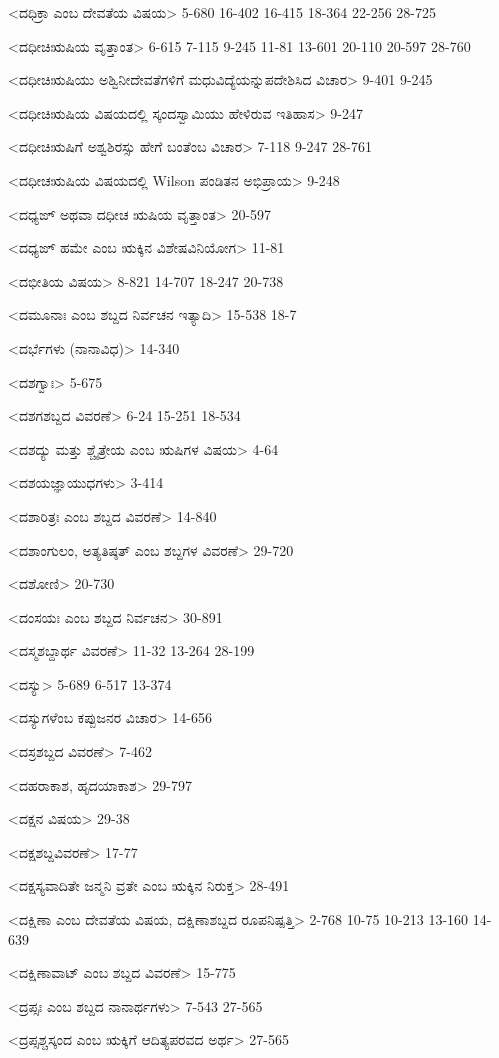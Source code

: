 <ದಧಿಕ್ರಾ ಎಂಬ ದೇವತೆಯ ವಿಷಯ>
5-680 
16-402 
16-415 
18-364
22-256
28-725

<ದಧೀಚಿಋಷಿಯ ವೃತ್ತಾಂತ>
6-615 
7-115 
9-245 
11-81 
13-601
20-110
20-597
28-760

<ದಧೀಚಿಋಷಿಯು ಅಶ್ವಿನೀದೇವತೆಗಳಿಗೆ ಮಧುವಿದ್ಯೆಯನ್ನುಪದೇಶಿಸಿದ ವಿಚಾರ>
9-401 
9-245

<ದಧೀಚಿಋಷಿಯ ವಿಷಯದಲ್ಲಿ ಸ್ಕಂದಸ್ವಾಮಿಯು ಹೇಳಿರುವ ಇತಿಹಾಸ>
9-247

<ದಧೀಚಿಋಷಿಗೆ ಅಶ್ವಶಿರಸ್ಸು ಹೇಗೆ ಬಂತೆಂಬ ವಿಚಾರ>
7-118 
9-247
28-761

<ದಧೀಚಋಷಿಯ ವಿಷಯದಲ್ಲಿ Wilson ಪಂಡಿತನ ಅಭಿಪ್ರಾಯ>
9-248

<ದಧ್ಯಙ್‍ ಅಥವಾ ದಧೀಚ ಋಷಿಯ ವೃತ್ತಾಂತ>
20-597

<ದಧ್ಯಙ್‍ ಹಮೇ ಎಂಬ ಋಕ್ಕಿನ ವಿಶೇಷವಿನಿಯೋಗ>
11-81

<ದಭೀತಿಯ ವಿಷಯ>
8-821 
14-707 
18-247 
20-738

<ದಮೂನಾಃ ಎಂಬ ಶಬ್ದದ ನಿರ್ವಚನ ಇತ್ಯಾದಿ>
15-538 
18-7

<ದರ್ಭೆಗಳು (ನಾನಾವಿಧ)>
14-340

<ದಶಗ್ವಾಃ>
5-675

<ದಶಗಶಬ್ದದ ವಿವರಣೆ>
6-24 
15-251 
18-534

<ದಶದ್ಯು ಮತ್ತು ಶ್ಚೈತ್ರೇಯ ಎಂಬ ಋಷಿಗಳ ವಿಷಯ>
4-64

<ದಶಯಜ್ಞಾಯುಧಗಳು>
3-414

<ದಶಾರಿತ್ರಃ ಎಂಬ ಶಬ್ದದ ವಿವರಣೆ>
14-840

<ದಶಾಂಗುಲಂ, ಅತ್ಯತಿಷ್ಠತ್‍ ಎಂಬ ಶಬ್ದಗಳ ವಿವರಣೆ>
29-720

<ದಶೋಣಿ>
20-730

<ದಂಸಯಃ ಎಂಬ ಶಬ್ದದ ನಿರ್ವಚನ>
30-891

<ದಸ್ಮಶಬ್ದಾರ್ಥ ವಿವರಣೆ>
11-32
13-264
28-199


<ದಸ್ಯು>
5-689
6-517 
13-374

<ದಸ್ಯುಗಳೆಂಬ ಕಪ್ಪುಜನರ ವಿಚಾರ>
14-656


<ದಸ್ರಶಬ್ದದ ವಿವರಣೆ>
7-462

<ದಹರಾಕಾಶ, ಹೃದಯಾಕಾಶ>
29-797

<ದಕ್ಷನ ವಿಷಯ>
29-38

<ದಕ್ಷಶಬ್ದವಿವರಣೆ>
17-77

<ದಕ್ಷಸ್ಯವಾದಿತೇ ಜನ್ಮನಿ ವ್ರತೇ ಎಂಬ ಋಕ್ಕಿನ ನಿರುಕ್ತ>
28-491

<ದಕ್ಷಿಣಾ ಎಂಬ ದೇವತೆಯ ವಿಷಯ, ದಕ್ಷಿಣಾಶಬ್ದದ ರೂಪನಿಷ್ಪತ್ತಿ>
2-768 
10-75 
10-213 
13-160
14-639

<ದಕ್ಷಿಣಾವಾಟ್‍ ಎಂಬ ಶಬ್ದದ ವಿವರಣೆ>
15-775


<ದ್ರಪ್ಸಃ ಎಂಬ ಶಬ್ದದ ನಾನಾರ್ಥಗಳು>
7-543 
27-565

<ದ್ರಪ್ಸಶ್ಚಸ್ಕಂದ ಎಂಬ ಋಕ್ಕಿಗೆ ಆದಿತ್ಯಪರವದ ಅರ್ಥ>
27-565

